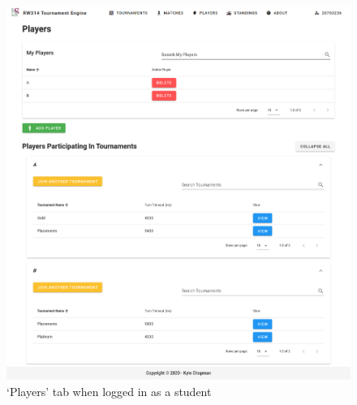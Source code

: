 \documentclass[a4paper, 11pt]{report}
\begin{document}
\begin{figure}[H]
	\centering
	\includegraphics[scale=0.37]{players-student.png}
	\caption{`Players' tab when logged in as a student}
	\label{fig:players-student}
\end{figure}
\end{document}
